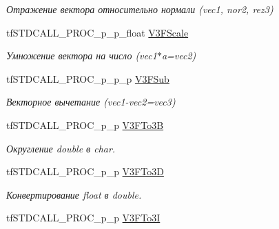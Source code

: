 \begin{DoxyCompactItemize}
\begin{DoxyCompactList}\small\item\em Отражение вектора относительно нормали (vec1, nor2, rez3) \end{DoxyCompactList}\item 
\hypertarget{structs_functions_vector_c_p_u_a22089dca3d85184b92377a3bc9acfb8c}{tf\-S\-T\-D\-C\-A\-L\-L\-\_\-\-P\-R\-O\-C\-\_\-p\-\_\-p\-\_\-float \hyperlink{structs_functions_vector_c_p_u_a22089dca3d85184b92377a3bc9acfb8c}{V3\-F\-Scale}}\label{structs_functions_vector_c_p_u_a22089dca3d85184b92377a3bc9acfb8c}

\begin{DoxyCompactList}\small\item\em Умножение вектора на число (vec1$\ast$a=vec2) \end{DoxyCompactList}\item 
\hypertarget{structs_functions_vector_c_p_u_a6cc6c8b51de7ec8a0584e53847545ff6}{tf\-S\-T\-D\-C\-A\-L\-L\-\_\-\-P\-R\-O\-C\-\_\-p\-\_\-p\-\_\-p \hyperlink{structs_functions_vector_c_p_u_a6cc6c8b51de7ec8a0584e53847545ff6}{V3\-F\-Sub}}\label{structs_functions_vector_c_p_u_a6cc6c8b51de7ec8a0584e53847545ff6}

\begin{DoxyCompactList}\small\item\em Векторное вычетание (vec1-\/vec2=vec3) \end{DoxyCompactList}\item 
\hypertarget{structs_functions_vector_c_p_u_af9f9adab16a20151e47c12111fe6af1c}{tf\-S\-T\-D\-C\-A\-L\-L\-\_\-\-P\-R\-O\-C\-\_\-p\-\_\-p \hyperlink{structs_functions_vector_c_p_u_af9f9adab16a20151e47c12111fe6af1c}{V3\-F\-To3\-B}}\label{structs_functions_vector_c_p_u_af9f9adab16a20151e47c12111fe6af1c}

\begin{DoxyCompactList}\small\item\em Округление double в char. \end{DoxyCompactList}\item 
\hypertarget{structs_functions_vector_c_p_u_a1a41162d65adab19eecba602e0818bfc}{tf\-S\-T\-D\-C\-A\-L\-L\-\_\-\-P\-R\-O\-C\-\_\-p\-\_\-p \hyperlink{structs_functions_vector_c_p_u_a1a41162d65adab19eecba602e0818bfc}{V3\-F\-To3\-D}}\label{structs_functions_vector_c_p_u_a1a41162d65adab19eecba602e0818bfc}

\begin{DoxyCompactList}\small\item\em Конвертирование float в double. \end{DoxyCompactList}\item 
\hypertarget{structs_functions_vector_c_p_u_a9e2de161368b8b0559b2c2446f60ca7e}{tf\-S\-T\-D\-C\-A\-L\-L\-\_\-\-P\-R\-O\-C\-\_\-p\-\_\-p \hyperlink{structs_functions_vector_c_p_u_a9e2de161368b8b0559b2c2446f60ca7e}{V3\-F\-To3\-I}}\label{structs_functions_vector_c_p_u_a9e2de161368b8b0559b2c2446f60ca7e}


\end{DoxyCompactItemize}
